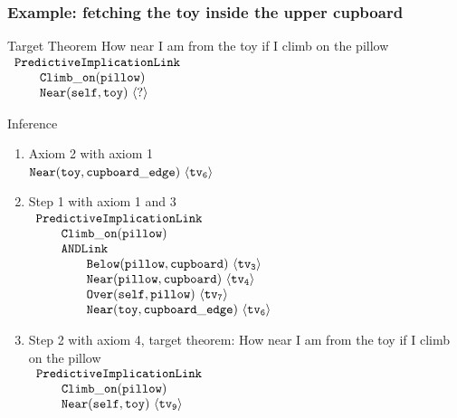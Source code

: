 \documentclass{beamer}
\newcommand{\NRl}{{\tt Near}}
\newcommand{\AND}{{\tt ANDLink}}
\newcommand{\TVC}{{\tt tv_3}}
\newcommand{\TVD}{{\tt tv_4}}
\newcommand{\TVF}{{\tt tv_6}}
\newcommand{\TVG}{{\tt tv_7}}
\newcommand{\TVI}{{\tt tv_9}}
\newcommand{\BTVC}{\langle \TVC \rangle}
\newcommand{\BTVD}{\langle \TVD \rangle}
\newcommand{\BTVF}{\langle \TVF \rangle}
\newcommand{\BTVG}{\langle \TVG \rangle}
\newcommand{\BTVI}{\langle \TVI \rangle}
\newcommand{\SP}{\qquad}
\begin{document}
\frame
{
  \frametitle{Example: fetching the toy inside the upper cupboard}
  \begin{beamerboxesrounded}{Target Theorem}
    {\tiny
      How near I am from the toy if I climb on the pillow\\
      $
      \begin{array}{l}
        {\tt PredictiveImplicationLink}\\
        \SP {\tt Climb\_on}({\tt pillow})\\
        \SP \NRl({\tt self}, {\tt toy})\ {\langle ? \rangle}\\
      \end{array}
      $
    }
  \end{beamerboxesrounded}
  \begin{beamerboxesrounded}{Inference}
    {\tiny
        \begin{enumerate}
        \item Axiom 2 with axiom 1\\
          $\NRl({\tt toy}, {\tt cupboard\_edge})\ \BTVF$
        \item Step 1 with axiom 1 and 3\\
          $
          \begin{array}{l}
            {\tt PredictiveImplicationLink}\\
            \SP {\tt Climb\_on}({\tt pillow})\\
            \SP \AND\\
            \SP \SP {\tt Below}({\tt pillow}, {\tt cupboard})\ \BTVC\\
            \SP \SP {\tt Near}({\tt pillow}, {\tt cupboard})\ \BTVD\\
            \SP \SP {\tt Over}({\tt self}, {\tt pillow})\ \BTVG\\
            \SP \SP \NRl({\tt toy}, {\tt cupboard\_edge})\ \BTVF\\
          \end{array}
          $
        \item Step 2 with axiom 4, target theorem: How near I am from
          the toy if I climb on the pillow\\
          $
          \begin{array}{l}
            {\tt PredictiveImplicationLink}\\
            \SP {\tt Climb\_on}({\tt pillow})\\
            \SP \NRl({\tt self}, {\tt toy})\ \BTVI\\
          \end{array}
          $
        \end{enumerate}
    }
  \end{beamerboxesrounded}
}
\end{document}
